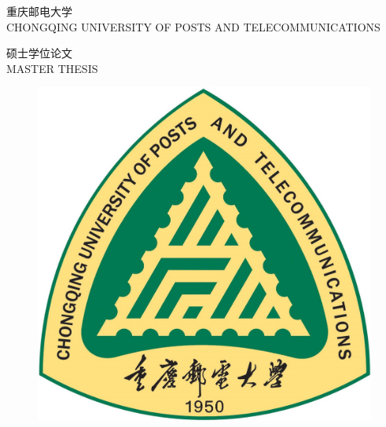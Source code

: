 \quad
\vspace{-3mm}

\begin{center}



\erhaod 重\hspace{11pt}庆\hspace{11pt}邮\hspace{11pt}电\hspace{11pt}大\hspace{11pt}学\\[1mm]
\xiaosid CHONGQING UNIVERSITY OF POSTS AND TELECOMMUNICATIONS\\
\vspace{14mm}

\chuhaod 硕士学位论文\\[2mm]
\sanhaod MASTER THESIS




\vspace{13mm}

        
        \begin{figure}[h]
        	\centering
        	\includegraphics[scale=0.475]{chapters/logo2.jpg}
        \end{figure}
\end{center}

